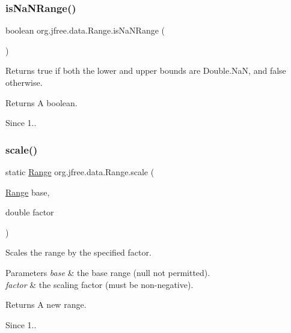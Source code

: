 \subsubsection{\texorpdfstring{is\+Na\+N\+Range()}{isNaNRange()}}
{\footnotesize\ttfamily boolean org.\+jfree.\+data.\+Range.\+is\+Na\+N\+Range (\begin{DoxyParamCaption}{ }\end{DoxyParamCaption})}

Returns {\ttfamily true} if both the lower and upper bounds are {\ttfamily Double.\+NaN}, and {\ttfamily false} otherwise.

\begin{DoxyReturn}{Returns}
A boolean.
\end{DoxyReturn}
\begin{DoxySince}{Since}
1.. 
\end{DoxySince}
\mbox{\label{classorg_1_1jfree_1_1data_1_1_range_af35eee30dfe7dc99e2b380e2c876ffce}} 
\subsubsection{\texorpdfstring{scale()}{scale()}}
{\footnotesize\ttfamily static \mbox{\hyperlink{classorg_1_1jfree_1_1data_1_1_range}{Range}} org.\+jfree.\+data.\+Range.\+scale (\begin{DoxyParamCaption}\item[{\mbox{\hyperlink{classorg_1_1jfree_1_1data_1_1_range}{Range}}}]{base,  }\item[{double}]{factor }\end{DoxyParamCaption})\hspace{0.3cm}{\ttfamily [static]}}

Scales the range by the specified factor.


\begin{DoxyParams}{Parameters}
{\em base} & the base range ({\ttfamily null} not permitted). \\
\hline
{\em factor} & the scaling factor (must be non-\/negative).\\
\hline
\end{DoxyParams}
\begin{DoxyReturn}{Returns}
A new range.
\end{DoxyReturn}
\begin{DoxySince}{Since}
1.. 
\end{DoxySince}
\mbox{\label{classorg_1_1jfree_1_1data_1_1_range_a9108f26775569665ffb11174293f4c5f}} 
